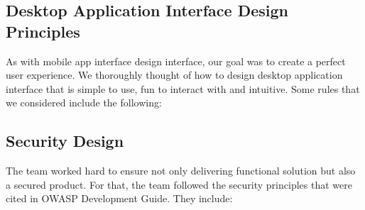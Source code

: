 \documentclass{article}
\begin{document}
\subsection{Desktop Application Interface Design Principles}
As with mobile app interface design interface, our goal was to create a perfect user experience. We thoroughly thought of how to design desktop application interface that is simple to use, fun to interact with and intuitive. Some rules that we considered include the following:


\subsection{Security Design}

The team worked hard to ensure not only delivering functional solution but also a secured product. For that, the team followed the security principles that were cited in OWASP Development Guide. They include:
\end{document}
